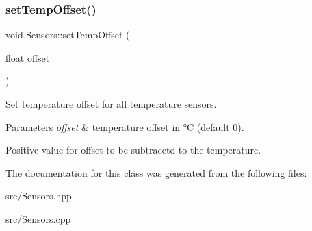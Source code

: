\subsubsection{\texorpdfstring{set\+Temp\+Offset()}{setTempOffset()}}
{\footnotesize\ttfamily void Sensors\+::set\+Temp\+Offset (\begin{DoxyParamCaption}\item[{float}]{offset }\end{DoxyParamCaption})}



Set temperature offset for all temperature sensors. 


\begin{DoxyParams}{Parameters}
{\em offset} & temperature offset in °C (default 0).\\
\hline
\end{DoxyParams}
Positive value for offset to be subtracetd to the temperature. 

The documentation for this class was generated from the following files\+:\begin{DoxyCompactItemize}
\item 
src/Sensors.\+hpp\item 
src/Sensors.\+cpp\end{DoxyCompactItemize}
